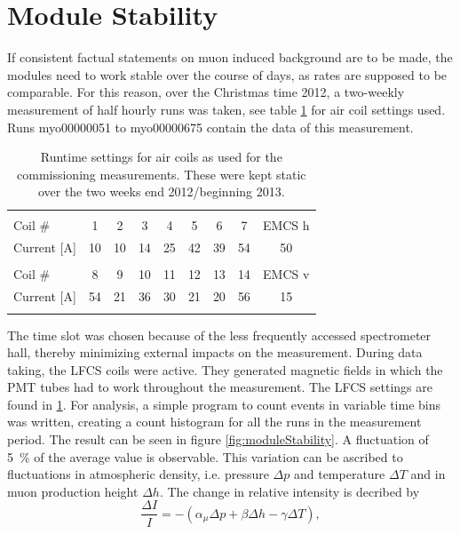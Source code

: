   \section{Module Stability}
  \label{ch:Analysis:sec:Module Stability}
  If consistent factual statements on muon induced background are to be made, the modules need to work stable over the course of days, as rates are supposed to be comparable. For this reason, over the Christmas time 2012, a two-weekly measurement of half hourly runs was taken, see table \ref{tab:airCoilSettingsChristmas} for air coil settings used. Runs myo00000051 to myo00000675 contain the data of this measurement.
  \begin{table}
  \centering
   \begin{tabular}{|l|ccccccc|c|}
    \hline
    &&&&&&&&\\
    Coil \#	&1	&2	&3	&4	&5	&6	&7	&EMCS h	\\
    Current [A]	&10	&10	&14	&25	&42	&39	&54	&50  	\\
    &&&&&&&&\\
    Coil \# 	&8	&9	&10	&11	&12	&13	&14	&EMCS v	\\
    Current [A]	&54	&21	&36	&30	&21	&20	&56	&15    	\\
    &&&&&&&&\\
    \hline
   \end{tabular}
  \caption[LFCS settings Stability Measurement]{Runtime settings for air coils as used for the commissioning measurements. These were kept static over the two weeks end 2012/beginning 2013.}
  \label{tab:airCoilSettingsChristmas}
  \end{table}
  The time slot was chosen because of the less frequently accessed spectrometer hall, thereby minimizing external impacts on the measurement. During data taking, the LFCS coils were active. They generated magnetic fields in which the PMT tubes had to work throughout the measurement. The LFCS settings are found in \ref{tab:airCoilSettingsChristmas}. For analysis, a simple program to count events in variable time bins was written, creating a count histogram for all the runs in the measurement period. The result can be seen in figure \ref{fig:moduleStability}. A fluctuation of \SI{5}{\percent} of the average value is observable. This variation can be ascribed to fluctuations in atmospheric density, i.e. pressure $\Delta p$ and temperature $\Delta T$ and in muon production height $\Delta h$. The change in relative intensity is decribed by
  \begin{equation}
  	\frac{\Delta I}{I} = - (\alpha_\mu\Delta p + \beta \Delta h -\gamma \Delta T),
  	\label{eq:muonStability}
  \end{equation}
